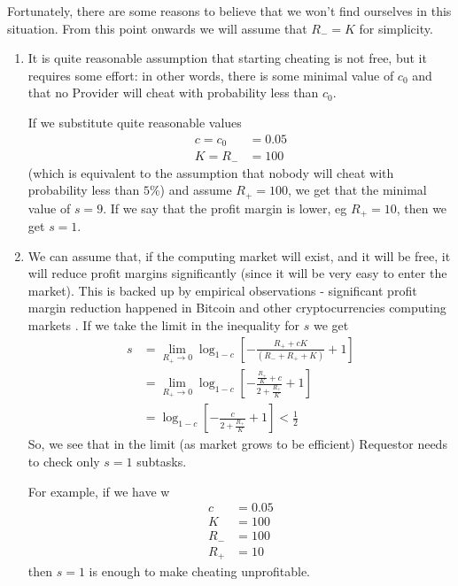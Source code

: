\documentclass{winnower}
\begin{document}
Fortunately, there are some reasons to believe that we won't find ourselves in this situation. From this point onwards we will assume that $R_{-} = K$ for simplicity.
\begin{enumerate}
\item It is quite reasonable assumption that starting cheating is not free, but it requires some effort: in other words, there is some minimal value of $c_0$ and that no Provider will cheat with probability less than $c_0$.

If we substitute quite reasonable values
\begin{equation}
\begin{aligned}
c = c_0 &= 0.05 \\
K = R_{-} &= 100
\end{aligned}
\end{equation}
(which is equivalent to the assumption that nobody will cheat with probability less than $5\%$) and assume $R_{+} = 100$,  we get that the minimal value of $s = 9$.
If we say that the profit margin is lower, eg $R_{+} = 10$, then we get $s = 1$. 
\item We can assume that, if the computing market will exist, and it will be free, it will reduce profit margins significantly (since it will be very easy to enter the market). This is backed up by empirical observations - significant profit margin reduction happened in Bitcoin and other cryptocurrencies computing markets \citep{bitcoinprofitmargins}. If we take the limit in the inequality for $s$ we get
\begin{equation}
\begin{aligned}
s &= \lim_{R_{+} \rightarrow 0} \log_{1-c}[- \frac{R_{+} + cK}{(R_{-} + R_{+} + K)} + 1] \\
&= \lim_{R_{+} \rightarrow 0} \log_{1-c}[- \frac{\frac{R_{+}}{K} + c}{2 + \frac{R_{+}}{K}} + 1] \\
&= \log_{1-c}[- \frac{c}{2 + \frac{R_{+}}{K}} + 1] < \frac{1}{2}
\end{aligned}
\end{equation}
So, we see that in the limit (as market grows to be efficient) Requestor needs to check only $s=1$ subtasks.

For example, if we have w
\begin{equation}
\begin{aligned}
c &= 0.05 \\
K &= 100 \\
R_{-} &= 100 \\
R_{+} &= 10
\end{aligned}
\end{equation}
then $s=1$ is enough to make cheating unprofitable.
\end{enumerate}
\end{document}
